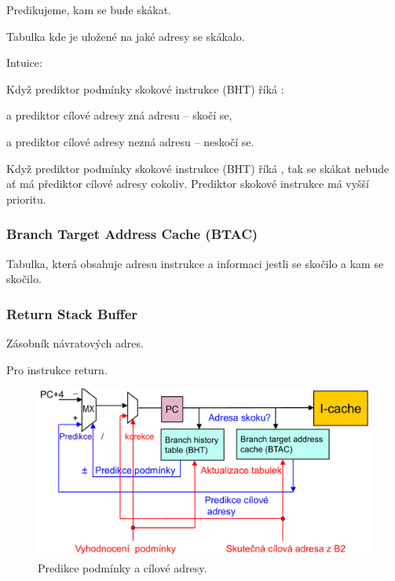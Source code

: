 \begin{compactitem}
    \item Predikujeme, kam se bude skákat.
    \item Tabulka kde je uložené na jaké adresy se skákalo.
    \item Intuice: \begin{compactitem}
        \item Když prediktor podmínky skokové instrukce (BHT) říká : \begin{compactitem}
            \item a prediktor cílové adresy zná adresu -- skočí se,
            \item a prediktor cílové adresy nezná adresu -- neskočí se.
        \end{compactitem}
        \item Když prediktor podmínky skokové instrukce (BHT) říká , tak se skákat nebude ať má přediktor cílové adresy cokoliv. Prediktor skokové instrukce má vyšší prioritu.
    \end{compactitem}
\end{compactitem}

\subsubsection{Branch Target Address Cache (BTAC)}

\begin{compactitem}
    \item Tabulka, která obsahuje adresu instrukce a informaci jestli se skočilo a kam se skočilo.
\end{compactitem}

\subsubsection{Return Stack Buffer}

\begin{compactitem}
    \item Zásobník návratových adres.
    \item Pro instrukce return.
\end{compactitem}

\begin{figure}[H]
    \centering
    \includegraphics[width=0.8\linewidth]{predikce_podminky_a_cilove_adresy.pdf}
    \caption{Predikce podmínky a cílové adresy.}
\end{figure}
